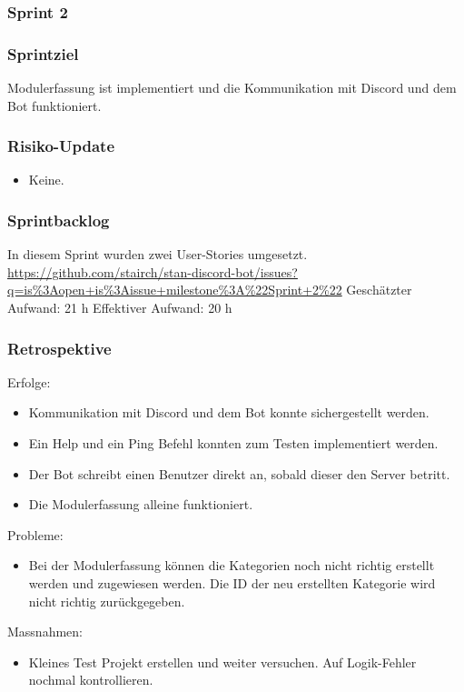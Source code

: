 \documentclass[a4paper, table]{article}
\begin{document}
\subsubsection{Sprint 2}
\subsubsection*{Sprintziel}
Modulerfassung ist implementiert und die Kommunikation mit Discord und dem Bot funktioniert.

\subsubsection*{Risiko-Update}
\begin{itemize}
    \item Keine.
\end{itemize}

\subsubsection*{Sprintbacklog}
In diesem Sprint wurden zwei User-Stories umgesetzt.\\
\url{https://github.com/stairch/stan-discord-bot/issues?q=is%3Aopen+is%3Aissue+milestone%3A%22Sprint+2%22}
\newline
Geschätzter Aufwand: 21 h
\newline
Effektiver Aufwand: 20 h

\subsubsection*{Retrospektive}
Erfolge:
\begin{itemize}
    \item Kommunikation mit Discord und dem Bot konnte sichergestellt werden.
    \item Ein Help und ein Ping Befehl konnten zum Testen implementiert werden.
    \item Der Bot schreibt einen Benutzer direkt an, sobald dieser den Server betritt.
    \item Die Modulerfassung alleine funktioniert.
\end{itemize}
Probleme:
\begin{itemize}
    \item Bei der Modulerfassung können die Kategorien noch nicht richtig erstellt werden und zugewiesen werden.
    Die ID der neu erstellten Kategorie wird nicht richtig zurückgegeben.
\end{itemize}
Massnahmen:
\begin{itemize}
    \item Kleines Test Projekt erstellen und weiter versuchen. Auf Logik-Fehler nochmal kontrollieren.
\end{itemize}
\newpage
\end{document}
